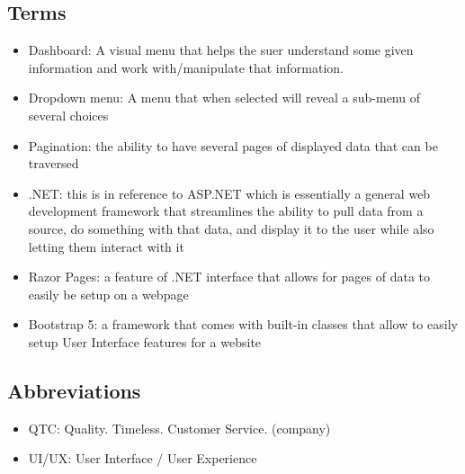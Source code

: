 \documentclass{article}
\begin{document}
\subsection{Terms}
\begin{itemize}
    \item Dashboard: A visual menu that helps the suer understand some given information and work with/manipulate that information.
    \item Dropdown menu: A menu that when selected will reveal a sub-menu of several choices
    \item Pagination: the ability to have several pages of displayed data that can be traversed
    \item .NET: this is in reference to ASP.NET which is essentially a general web development framework that streamlines the ability to pull data from a source, do something with that data, and display it to the user while also letting them interact with it
    \item Razor Pages: a feature of .NET interface that allows for pages of data to easily be setup on a webpage
    \item Bootstrap 5: a framework that comes with built-in classes that allow to easily setup User Interface features for a website
\end{itemize}

\subsection{Abbreviations}
\begin{itemize}
    \item QTC: Quality. Timeless. Customer Service. (company)
    \item UI/UX: User Interface / User Experience
\end{itemize}
\end{document}
